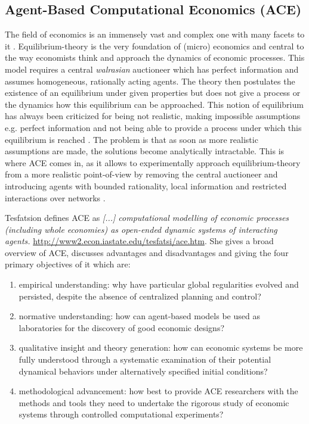 \subsection{Agent-Based Computational Economics (ACE)}
The field of economics is an immensely vast and complex one with many facets to it \cite{bowles_understanding_2005}. Equilibrium-theory is the very foundation of (micro) economics \cite{colell_microeconomic_1995} and central to the way economists think and approach the dynamics of economic processes. This model requires a central \textit{walrasian} auctioneer which has perfect information and assumes homogeneous, rationally acting agents. The theory then postulates the existence of an equilibrium under given properties but does not give a process or the dynamics how this equilibrium can be approached. 
This notion of equilibrium has always been criticized for being not realistic, making impossible assumptions e.g. perfect information and not being able to provide a process under which this equilibrium is reached \cite{kirman_complex_2010}. The problem is that as soon as more realistic assumptions are made, the solutions become analytically intractable. This is where ACE comes in, as it allows to experimentally approach equilibrium-theory from a more realistic point-of-view by removing the central auctioneer and introducing agents with bounded rationality, local information and restricted interactions over networks \cite{farmer_economy_2009}. 

Tesfatsion defines ACE as \textit{[...] computational modelling of economic processes (including whole economies) as open-ended dynamic systems of interacting agents.} \url{http://www2.econ.iastate.edu/tesfatsi/ace.htm}. She gives a broad overview \cite{tesfatsion_agent-based_2006} of ACE, discusses advantages and disadvantages and giving the four primary objectives of it which are:

\begin{enumerate}
	\item empirical understanding: why have particular global regularities evolved and persisted, despite the absence of centralized planning and control?
	\item normative understanding: how can agent-based models be used as laboratories for the discovery of good economic designs?
	\item qualitative insight and theory generation: how can economic systems be more fully understood through a systematic examination of their potential dynamical behaviors under alternatively specified initial conditions?
	\item methodological advancement: how best to provide ACE researchers with the methods and tools they need to undertake the rigorous study of economic systems through controlled computational experiments?
\end{enumerate}

